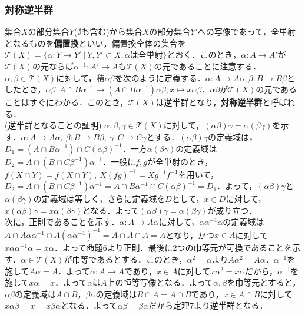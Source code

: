 \documentclass{jsarticle}
\begin{document}
\subsubsection{対称逆半群}
集合$X$の部分集合$Y$($\emptyset$も含む)から集合$X$の部分集合$Y'$への写像であって，全単射となるものを{\bf 偏置換}といい，偏置換全体の集合を${\mathscr T}(X)=\{\alpha:Y\rightarrow Y'\:|\:Y,Y'\subset X, \alpha は全単射\}$とおく．このとき，$\alpha:A\rightarrow A'$が${\mathscr T}(X)$の元ならば$\alpha^{-1}:A'\rightarrow A$も${\mathscr T}(X)$の元であることに注意する．$\alpha,\beta\in {\mathscr T}(X)$に対して，積$\alpha\beta$を次のように定義する．$\alpha:A\rightarrow A\alpha,\beta:B\rightarrow B\beta$としたとき，$\alpha\beta:A\cap B\alpha^{-1}\rightarrow (A\cap B\alpha^{-1})\alpha\beta;x\mapsto x\alpha\beta$．$\alpha\beta$が${\mathscr T}(X)$の元であることはすぐにわかる．このとき，${\mathscr T}(X)$は逆半群となり，{\bf 対称逆半群}と呼ばれる．\\
(逆半群となることの証明)
$\alpha,\beta,\gamma\in{\mathscr T}(X)$に対して，$(\alpha\beta)\gamma=\alpha(\beta\gamma)$を示す．$\alpha:A\rightarrow A\alpha,\:\beta:B\rightarrow B\beta,\:\gamma:C\rightarrow C\gamma$とする．$(\alpha\beta)\gamma$の定義域は，$D_1=(A\cap B\alpha^{-1})\cap C(\alpha\beta)^{-1}$．一方$\alpha(\beta\gamma)$の定義域は$D_2=A\cap(B\cap C\beta^{-1})\alpha^{-1}$．一般に$f,g$が全単射のとき，$f(X\cap Y)=f(X\cap Y),\:X(fg)^{-1}=Xg^{-1}f^{-1}$を用いて，$D_2=A\cap(B\cap C\beta^{-1})\alpha^{-1}=A\cap B\alpha^{-1}\cap C(\alpha\beta)^{-1}=D_1$．よって，$(\alpha\beta)\gamma$と$\alpha(\beta\gamma)$の定義域は等しく，さらに定義域を$D$として，$x\in D$に対して，$x(\alpha\beta)\gamma=x\alpha(\beta\gamma)$となる．よって$(\alpha\beta)\gamma=\alpha(\beta\gamma)$が成り立つ．\\
次に，正則であることを示す．$\alpha:A\rightarrow A\alpha$に対して，$\alpha\alpha^{-1}\alpha$の定義域は$A\cap A\alpha\alpha^{-1}\cap A(\alpha\alpha^{-1})^{-1}=A\cap A\cap A=A$となり，かつ$x\in A$に対して$x\alpha\alpha^{-1}\alpha=x\alpha$．よって命題6より正則．最後に2つの巾等元が可換であることを示す．$\alpha\in{\mathscr T}(X)$が巾等であるとする．このとき，$\alpha^2=\alpha$より$A\alpha^2=A\alpha$．$\alpha^{-1}$を施して$A\alpha=A$．よって$\alpha:A\rightarrow A$であり，$x\in A$に対して$x\alpha^2=x\alpha$だから，$\alpha^{-1}$を施して$x\alpha=x$．よって$\alpha$は$A$上の恒等写像となる．よって$\alpha,\beta$を巾等元とすると，$\alpha\beta$の定義域は$A\cap B$，$\beta\alpha$の定義域は$B\cap A=A\cap B$であり，$x\in A\cap B$に対して$x\alpha\beta=x=x\beta\alpha$となる．よって$\alpha\beta=\beta\alpha$だから定理7より逆半群となる．
\end{document}
